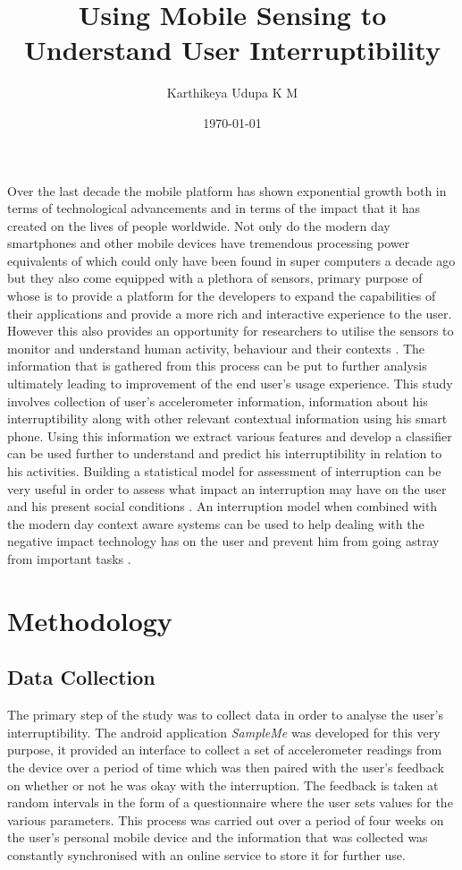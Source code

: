 \documentclass[10pt,a4paper]{article}
\title{Using Mobile Sensing to Understand User Interruptibility}
\author{Karthikeya Udupa K M}
\date{\today}
\begin{document}
 

\maketitle
\noindent
Over the last decade the mobile platform has shown exponential growth both in terms of technological advancements and in terms of the impact that it has created on the lives of people worldwide. Not only do the modern day smartphones and other mobile devices have tremendous processing power equivalents of which could only have been found in super computers a decade ago but they also come equipped with a plethora of sensors, primary purpose of whose is to provide a platform for the developers to expand the capabilities of their applications and provide a more rich and interactive experience to the user. However this also provides an opportunity for researchers to utilise the sensors to monitor and understand human activity, behaviour and their contexts \cite{lane2010survey}. The information that is gathered from this process can be put to further analysis ultimately leading to improvement of the end user's usage experience.
\newline
\newline
This study involves collection of user's accelerometer information, information about his interruptibility along with other relevant contextual information using his smart phone. Using this information we extract various features and develop a classifier can be used further to understand and predict his interruptibility in relation to his activities. Building a statistical model for assessment of interruption can be very useful in order to assess what impact an interruption may have on the user and his present social conditions \cite{fogarty2005predicting}. An interruption model when combined with the modern day context aware systems can be used to help dealing with the negative impact technology has on the user and prevent him from going astray from important tasks \cite{erickson2002some,moran2001introduction}.

\section{Methodology}
\subsection{Data Collection}
The primary step of the study was to collect data in order to analyse the user's interruptibility. The android application \textit{SampleMe} was developed for this very purpose, it provided an interface to collect a set of accelerometer readings from the device over a period of time which was then paired with the user's feedback on whether or not he was okay with the interruption. The feedback is taken at random intervals in the form of a questionnaire where the user sets values for the various parameters. This process was carried out over a period of four weeks on the user's personal mobile device and the information that was collected was constantly synchronised with an online service to store it for further use.
\end{document}
